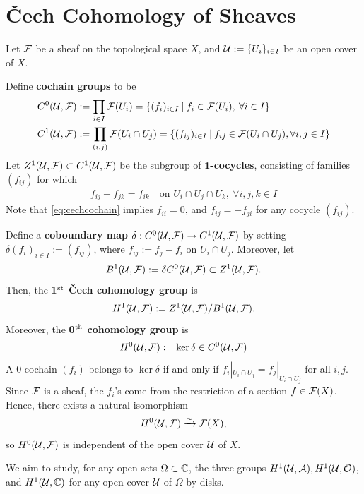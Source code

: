\documentclass[11pt]{article}
\begin{document}
\section{\v{C}ech Cohomology of Sheaves}


Let $\mc F$ be a sheaf on the topological space $X$, and $\mc U:= \{U_i\}_{i \in I}$ be an open cover of $X$.
\begin{defn}
    Define \textbf{cochain groups} to be 
    \begin{align*}
        C^0(\mc U,\mc F) &:= \prod_{i \in I}\mc F(U_i) = \brax{ (f_i)_{i \in I} \setbar f_i \in \mc F(U_i), \: \forall i \in I} \\
        C^1 (\mc U,\mc F) &:= \prod_{(i,j)}\mc F(U_i \cap U_j)=\brax{ (f_{ij})_{i \in I} \setbar f_{ij} \in \mc F (U_i \cap U_j), \forall i,j \in I}
    \end{align*}
    Let $Z^1(\mc U,\mc F) \subset C^1(\mc U, \mc F)$ be the subgroup of $\bm 1$\textbf{-cocycles}, consisting of families $(f_{ij})$ for which
    \begin{align} \label{eq:cechcochain}
        f_{ij}+f_{jk}=f_{ik} \quad \text{on } U_i \cap U_j \cap U_k, \: \forall i,j,k \in I
    \end{align}
    Note that \eqref{eq:cechcochain} implies $f_{ii}=0$, and $f_{ij}=-f_{ji}$ for any cocycle $(f_{ij})$.

    Define a \textbf{coboundary map} $\delta: C^0(\mc U,\mc F)\to C^1(\mc U,\mc F)$ by setting $\delta(f_i)_{i\in I}:=(f_{ij})$, where $f_{ij}:= f_j-f_i$ on $U_i \cap U_j$. Moreover, let
    \[ B^1(\mc U,\mc F) := \delta C^0(\mc U,\mc F) \subset Z^1(\mc U,\mc F). \]
    Then, the \textbf{1$\st$ \v{C}ech cohomology group} is
    \[
    H^1(\mc U,\mc F):= Z^1(\mc U,\mc F)/B^1 (\mc U, \mc F).
    \]
    Moreover, the \textbf{0$\th$ cohomology group} is
    \[
    H^0(\mc U,\mc F):= \ker \delta \in C^0(\mc U,\mc F)
    \]
    A $0$-cochain $(f_i)$ belongs to $\ker \delta$ if and only if $f_{i}|_{U_i \cap U_j}=f_j|_{U _i \cap U_j}$ for all $i, j$. Since $\mc F$ is a sheaf, the $f_i$'s come from the restriction of a section $f \in \mc F(X)$. Hence, there exists a natural isomorphism
    \[
    H^0(\mc U,\mc F) \arr[\sim]\mc F(X),
    \]
    so $H^0(\mc U,\mc F)$ is independent of the open cover $\mc U$ of $X$.
\end{defn}

\begin{notethm*}[Goal]
    We aim to study, for any open sets $\Omega \subset \C$, the three groups $H^1(\mc U, \mc A), H^1(\mc U, \mc O)$, and $H^1(\mc U, \mc \C)$ for any open cover $\mc U$ of $\Omega$ by disks.
\end{notethm*}
\end{document}
